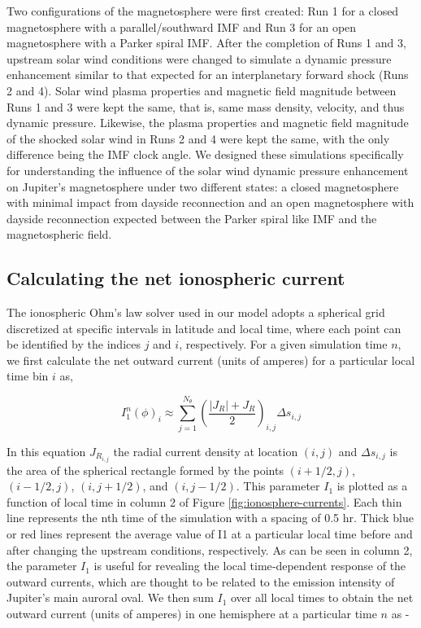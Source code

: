 Two configurations of the magnetosphere were first created: Run 1 for a closed magnetosphere with a parallel/southward IMF and Run 3 for an open magnetosphere with a Parker spiral IMF. After the completion of Runs 1 and 3, upstream solar wind conditions were changed to simulate a dynamic pressure enhancement similar to that expected for an interplanetary forward shock (Runs 2 and 4). Solar wind plasma properties and magnetic field magnitude between Runs 1 and 3 were kept the same, that is, same mass density, velocity, and thus dynamic pressure. Likewise, the plasma properties and magnetic field magnitude of the shocked solar wind in Runs 2 and 4 were kept the same, with the only difference being the IMF clock angle. We designed these simulations specifically for understanding the influence of the solar wind dynamic pressure enhancement on Jupiter's magnetosphere under two different states: a closed magnetosphere with minimal impact from dayside reconnection and an open magnetosphere with dayside reconnection expected between the Parker spiral like IMF and the magnetospheric field.

\subsection{Calculating the net ionospheric current}
The ionospheric Ohm's law solver used in our model adopts a spherical grid discretized at specific intervals in latitude and local time, where each point can be identified by the indices $j$ and $i$, respectively. For a given simulation time $n$, we first calculate the net outward current (units of amperes) for a particular local time bin $i$ as,

\begin{equation}
    I_1^n \left(\phi\right)_i \approx \sum_{j=1}^{N_\theta} \left( \frac{|J_R| + J_R }{2} \right)_{i,j} \Delta s_{i,j}
\end{equation}

In this equation $J_{R_{i,j}}$ the radial current density at location $(i,j)$ and $\Delta s_{i,j}$ is the area of the spherical rectangle formed by the points $(i+1/2,j)$, $(i-1/2,j)$, $(i,j+1/2)$, and $(i,j-1/2)$. This parameter $I_1$ is plotted as a function of local time in column 2 of Figure \ref{fig:ionosphere-currents}. Each thin line represents the nth time of the simulation with a spacing of 0.5 hr. Thick blue or red lines represent the average value of I1 at a particular local time before and after changing the upstream conditions, respectively. As can be seen in column 2, the parameter $I_1$ is useful for revealing the local time‐dependent response of the outward currents, which are thought to be related to the emission intensity of Jupiter's main auroral oval. We then sum $I_1$ over all local times to obtain the net outward current (units of amperes) in one hemisphere at a particular time $n$ as - 

